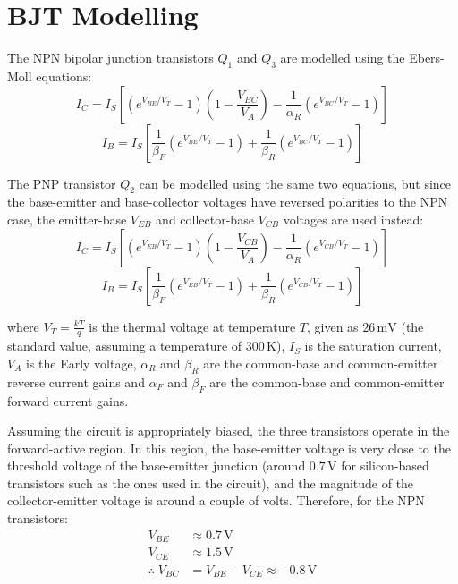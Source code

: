 \documentclass[12pt,a4paper]{article}
\begin{document}
\section{BJT Modelling}

The NPN bipolar junction transistors $Q_1$ and $Q_3$ are modelled using the Ebers-Moll equations:
\begin{equation}
    I_C = I_S \left[\left(e^{V_{BE}/V_T} - 1\right)\left(1 - \frac{V_{BC}}{V_A}\right)
          - \frac{1}{\alpha_R}\left(e^{V_{BC}/V_T} - 1\right)\right]
    \label{eq:IC_NPN_full}
\end{equation}
\begin{equation}
    I_B = I_S \left[\frac{1}{\beta_F}\left(e^{V_{BE}/V_T} - 1\right)
          + \frac{1}{\beta_R}\left(e^{V_{BC}/V_T} - 1\right)\right]
    \label{eq:IB_NPN_full}
\end{equation}

The PNP transistor $Q_2$ can be modelled using the same two equations, but since the
base-emitter and base-collector voltages have reversed polarities to the NPN case, the
emitter-base $V_{EB}$ and collector-base $V_{CB}$ voltages are used instead:
\begin{equation}
    I_C = I_S \left[\left(e^{V_{EB}/V_T} - 1\right)\left(1 - \frac{V_{CB}}{V_A}\right)
          - \frac{1}{\alpha_R}\left(e^{V_{CB}/V_T} - 1\right)\right]
    \label{eq:IC_PNP_full}
\end{equation}
\begin{equation}
    I_B = I_S \left[\frac{1}{\beta_F}\left(e^{V_{EB}/V_T} - 1\right)
          + \frac{1}{\beta_R}\left(e^{V_{CB}/V_T} - 1\right)\right]
    \label{eq:IB_PNP_full}
\end{equation}

where $V_T = \frac{kT}{q}$ is the thermal voltage at temperature $T$, given as $26\,\text{mV}$
(the standard value, assuming a temperature of $300\,\text{K}$), $I_S$ is the saturation current,
$V_A$ is the Early voltage, $\alpha_R$ and $\beta_R$ are the common-base and common-emitter
reverse current gains and $\alpha_F$ and $\beta_F$ are the common-base and common-emitter
forward current gains.

Assuming the circuit is appropriately biased, the three transistors operate in the forward-active
region. In this region, the base-emitter voltage is very close to the threshold voltage of the
base-emitter junction (around $0.7\,\text{V}$ for silicon-based transistors such as the ones used
in the circuit), and the magnitude of the collector-emitter voltage is around a couple of volts.
Therefore, for the NPN transistors:
\begin{align*}
    V_{BE} &\approx 0.7\,\text{V} \\
    V_{CE} &\approx 1.5\,\text{V} \\
    \therefore\; V_{BC} &= V_{BE} - V_{CE} \approx -0.8\,\text{V}
\end{align*}
\end{document}

